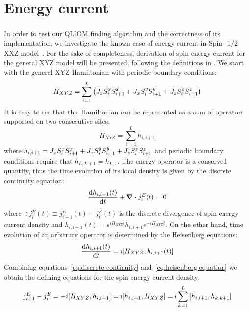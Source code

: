\chapter{Energy current}
\thispagestyle{chapterBeginStyle}
\label{chap:energy current}

\paragraph{}In order to test our QLIOM finding algorithm and the correctness of its implementation, we investigate the known case of
energy current in Spin\(-1/2\) XXZ model~\autocite*{Mierzejewski2015Approx}. For the sake of completeness, derivation of
spin energy current for the general XYZ model will be presented, following the definitions in \textcite{Zotos1997}.
We start with the general XYZ Hamiltonian with periodic boundary conditions:
\begin{equation}
    H_{XYZ} = \sum_{i=1}^L  \left( J_{x} S^{x}_{i}S^{x}_{i+1} + J_{x} S^{y}_{i}S^{y}_{i+1} + J_{z} S^{z}_{i}S^{z}_{i+1} \right)
\end{equation}
It is easy to see that this Hamiltonian can be represented as a sum of operators supported on two consecutive sites:
\begin{equation}
    H_{XYZ} = \sum_{i=1}^L h_{i,i+1}
\end{equation}
where \(h_{i,i+1} = J_{x} S^{x}_{i}S^{x}_{i+1} + J_{x} S^{y}_{i}S^{y}_{i+1} + J_{z} S^{z}_{i}S^{z}_{i+1} \) and periodic boundary conditions
require that \(h_{L,L+1} = h_{L,1}\). The energy operator is a conserved quantity, thus the time evolution of its local density
is given by the discrete continuity equation:
\begin{equation}
    \dv{h_{i,i+1}(t)}{t} + \div{j_{i}^{E}(t)} = 0 
    \label{eq:discrete continuity}
\end{equation}
where \(\div{j_{i}^E(t)} \equiv j_{i+1}^E(t) - j_{i}^E(t)\) is the discrete divergence of spin energy current density and \(h_{i,i+1}(t) = e^{i H_{XYZ}t} h_{i,i+1} e^{-i H_{XYZ} t}\).
On the other hand, time evolution of an arbitrary operator is determined
by the Heisenberg equations:
\begin{equation}
    \dv{h_{i,i+1}(t)}{t} = i \comm{H_{XYZ}}{h_{i,i+1}(t)}
    \label{eq:heisenberg equation}
\end{equation}
Combining equations~\eqref{eq:discrete continuity} and~\eqref{eq:heisenberg equation} we obtain the defining equations for
the spin energy current density:
\begin{equation}
    j_{i+1}^E - j_{i}^E = - i \comm{H_{XYZ}}{h_{i,i+1}} = i \comm{h_{i,i+1}}{H_{XYZ}} = i \sum_{k=1}^L \comm{h_{i,i+1}}{h_{k,k+1}} 
    \label{eq:energy current defining equation}
\end{equation}

